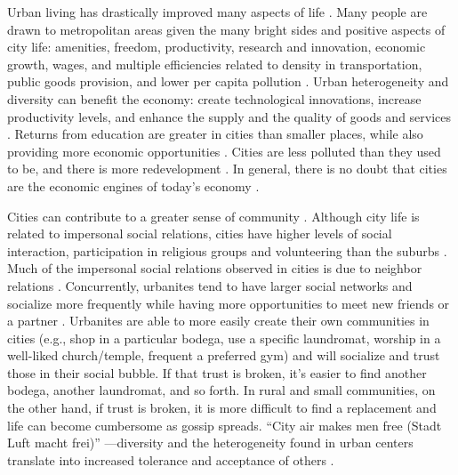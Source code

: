 \documentclass[11pt, letterpaper]{article}
\begin{document}
\begin{spacing}{1.4}
Urban living has drastically improved many aspects of life \citep[e.g.,][]{glaeser11}.  
 Many people  are drawn to metropolitan areas  given the many bright sides and positive aspects of city life: amenities, freedom, productivity, research and innovation, economic growth, wages, and multiple efficiencies related to
density in transportation, public goods provision, and lower per capita pollution \citep{tonnies57,osullivan09,meyer13,rosenthal02,bettencourt10}.
  Urban heterogeneity and diversity can benefit the economy: create technological
innovations, increase productivity levels, and enhance the supply and the
quality of goods and services \citep{rodriguez2019does}.
Returns from education are greater in cities than smaller places, while also
providing more economic opportunities \citep{florida13}. 
 Cities are
 less polluted than they used to be, and there is more redevelopment
 \citep[e.g.,][]{glaeser11}%
.
 In general, there is no doubt that cities are the economic engines of today's
 economy \citep[e.g.,][]{osullivan09}. 

 Cities can contribute to a greater sense
 of community \citep[]{chavis2002sense,macke2019smart}. 
 Although city life is related to impersonal social relations, cities have higher levels of social interaction, participation in religious groups and volunteering than the suburbs \citep{nguyen10,mazumdar18}.    
 Much of the impersonal social relations observed in cities is due to neighbor
relations \citep{nguyen10,mazumdar18}. Concurrently, urbanites tend to have
larger social networks and socialize more frequently while having more
opportunities to meet new friends or a partner
\citep{mouratidis18,anon17-cities-oslo}.
Urbanites are able to more easily
create their own communities in cities (e.g., shop in a particular bodega, use a
specific laundromat, worship in a well-liked church/temple, frequent a preferred
gym) and will socialize and trust those in their social bubble. If that trust is
broken, it's easier to find another bodega, another laundromat, and so forth. {In rural and small communities, on the other hand, if trust is broken, it is more difficult to find a replacement and life can become cumbersome as gossip spreads.}
``City air makes men free (Stadt Luft macht frei)'' \citep[p.12]{park84}---diversity and the heterogeneity found in urban centers translate into increased tolerance and acceptance of others \citep{tuch87,wirth38,stephan82,aok20}. %




\end{spacing}
\end{document}

